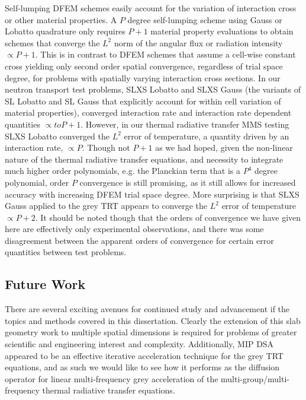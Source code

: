 Self-lumping DFEM schemes easily account for the variation of interaction cross or other material properties.
A $P$ degree self-lumping scheme using Gauss or Lobatto quadrature only requires $P+1$ material property evaluations to obtain schemes that converge the $L^2$ norm of the angular flux or radiation intensity $\propto P+1$.
This is in contrast to DFEM schemes that assume a cell-wise constant cross yielding only second order spatial convergence, regardless of trial space degree, for problems with spatially varying interaction cross sections.
In our neutron transport test problems, SLXS Lobatto and SLXS Gauss (the variants of SL Lobatto and SL Gauss that explicitly account for within cell variation of material properties), converged interaction rate and interaction rate dependent quantities $\propto to P+1$.
However, in our thermal radiative transfer MMS testing SLXS Lobatto converged the $L^2$ error of temperature, a quantity driven by an interaction rate, $\propto P$.
Though not $P+1$ as we had hoped, given the non-linear nature of the thermal radiative transfer equations, and necessity to integrate much higher order polynomials, e.g. the Planckian term that is a $P^4$ degree polynomial, order $P$ convergence is still promising, as it still allows for increased accuracy with increasing DFEM trial space degree.
More surprising is that SLXS Gauss applied to the grey TRT appears to converge the $L^2$ error of temperature $\propto P+2$.
It should be noted though that the orders of convergence we have given here are effectively only experimental observations, and there was some disagreement between the apparent orders of convergence for certain error quantities between test problems.

\subsection{Future Work}

There are several exciting avenues for continued study and advancement if the topics and methods covered in this dissertation.
Clearly the extension of this slab geometry work to multiple spatial dimensions is required for problems of greater scientific and engineering interest and complexity.
Additionally, MIP DSA appeared to be an effective iterative acceleration technique for the grey TRT equations, and as such we would like to see how it performs as the diffusion operator for linear multi-frequency grey acceleration of the multi-group/multi-frequency thermal radiative transfer equations.

